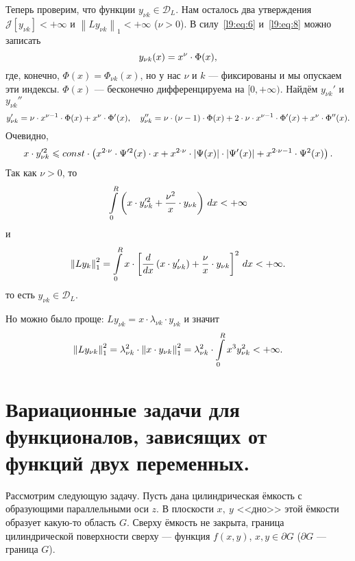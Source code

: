 \documentclass[12pt,a4paper,openany,fleqn]{book}
\newcommand{\J}{\ensuremath{\mathcal{J}}}
\newcommand{\mc}[1]{\ensuremath{\mathcal{#1}}}
\newcommand{\der}[2]{\ensuremath{\frac{d#1}{d#2}}}
\newcommand{\norm}[1]{\ensuremath{\left\|#1\right\|}}
\theoremstyle{definition}
\begin{document}
	Теперь проверим, что функции $y_{\nu k}\in\mc{D}_L$. Нам осталось два утверждения $\J[y_{\nu k}]<+\infty$ и $\norm{Ly_{\nu k}}_1<+\infty$ ($\nu>0$). В силу~\eqref{l9:eq:6} и~\eqref{l9:eq:8} можно записать
	\begin{equation*}
		\hfill y_{\nu k}(x)=x^{\nu}\cdot\Phi(x),\hfill 
	\end{equation*}
	где, конечно, $\Phi(x)=\Phi_{\nu k}(x)$, но у нас $\nu$ и $k$ --- фиксированы и мы опускаем эти индексы. $\Phi(x)$ --- бесконечно дифференцируема на $[0,+\infty)$. Найдём $y_{\nu k}'$ и $y_{\nu k}''$
	\begin{equation*}
		\hfill y_{\nu k}'=\nu\cdot x^{\nu-1}\cdot\Phi(x)+x^{\nu}\cdot\Phi'(x),\quad y_{\nu k}''=\nu\cdot(\nu-1)\cdot\Phi(x)+2\cdot\nu\cdot x^{\nu-1}\cdot\Phi'(x)+x^{\nu}\cdot\Phi''(x).\hfill
	\end{equation*}
	Очевидно,
	\begin{equation*}
		\hfill x\cdot y_{\nu k}^{\prime2}\leqslant const\cdot\left(x^{2\cdot\nu}\cdot\Psi^{\prime2}(x)\cdot x+x^{2\cdot\nu}\cdot|\Psi(x)|\cdot|\Psi'(x)|+x^{2\cdot\nu-1}\cdot\Psi^2(x)\right).\hfill
	\end{equation*}
	Так как $\nu>0$, то
	\begin{equation*}
		\hfill\int\limits_0^R\left(x\cdot y_{\nu k}^{\prime2}+\frac{\nu^2}{x}\cdot y_{\nu k}\right)\,dx<+\infty\hfill
	\end{equation*}
	и 
	\begin{equation*}
		\hfill\norm{Ly_k}_1^2=\int\limits_0^R x\cdot\left[\der{}{x}\left(x\cdot y_{\nu k}'\right)+\frac{\nu}{x}\cdot y_{\nu k}\right]^2\,dx<+\infty.\hfill
	\end{equation*}
	то есть $y_{\nu k}\in\mc{D}_L$. 
	
	Но можно было проще: $Ly_{\nu k}=x\cdot\lambda_{\nu k}\cdot y_{\nu k}$ и значит
	\begin{equation*}
		\hfill\norm{Ly_{\nu k}}_1^2=\lambda_{\nu k}^2\cdot\norm{x\cdot y_{\nu k}}_1^2=\lambda_{\nu k}^2\cdot\int\limits_0^R x^3 y_{\nu k}^2<+\infty.\hfill
	\end{equation*} 
	\section[Функционалы, зависящие от функций двух переменных.]{Вариационные задачи для функционалов, зависящих от функций двух переменных.}
	\label{lecture9section2}
	Рассмотрим следующую задачу. Пусть дана цилиндрическая ёмкость с образующими параллельными оси $z$. В плоскости $x,\ y$ <<дно>> этой ёмкости образует какую-то область $G$. Сверху ёмкость не закрыта, граница цилиндрической поверхности сверху --- функция $f(x,y)$, $x,y\in\partial G$ ($\partial G$ --- граница $G$).
	
\end{document}
